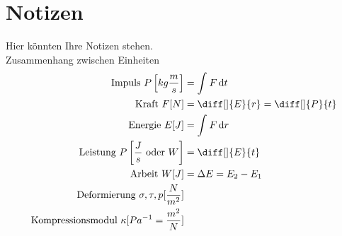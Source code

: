 \documentclass[a4paper,12pt]{article}
\newcommand{\td}{\,\text{d}}
\numberwithin{equation}{section}
\begin{document}


\section{Notizen}
Hier könnten Ihre Notizen stehen.\\
Zusammenhang zwischen Einheiten
\begin{align*}
        \text{Impuls }P\left[kg\dfrac{m}{s}\right]&=\int_{}^{}F\td t\\
        \text{Kraft }F[N]&=\diff[]{E}{r}=\diff[]{P}{t}\\
        \text{Energie }E[J]&=\int_{}^{}F\td r\\
        \text{Leistung }P\left[\dfrac{J}{s}\text{ oder }W\right]&=\diff[]{E}{t}\\
        \text{Arbeit }W[J]&=\Delta E=E_2-E_1\\
        \text{Deformierung }\sigma ,\tau ,p[\dfrac{N}{m^2}]\\
        \text{Kompressionsmodul }\kappa[Pa^{-1}=\dfrac{m^2}{N}]
\end{align*}


\end{document}

